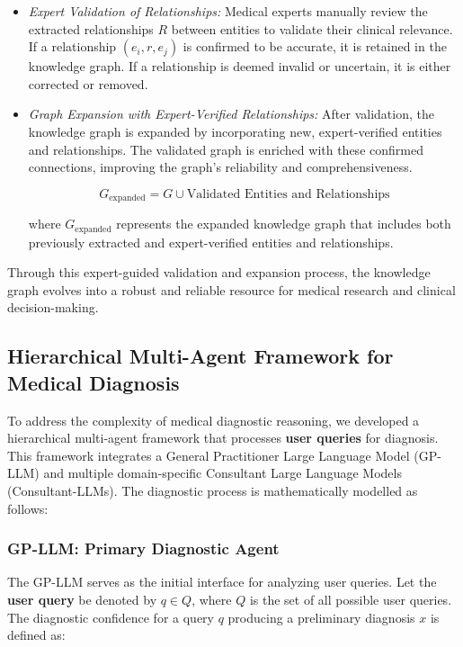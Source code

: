 \documentclass[letterpaper]{article} %
\begin{document}
\begin{itemize}
    \item \emph{Expert Validation of Relationships:} Medical experts manually review the extracted relationships \( R \) between entities to validate their clinical relevance. If a relationship \( (e_i, r, e_j) \) is confirmed to be accurate, it is retained in the knowledge graph. If a relationship is deemed invalid or uncertain, it is either corrected or removed.
    
    \item \emph{Graph Expansion with Expert-Verified Relationships:} After validation, the knowledge graph is expanded by incorporating new, expert-verified entities and relationships. The validated graph is enriched with these confirmed connections, improving the graph’s reliability and comprehensiveness.
    
    \[
    G_{\text{expanded}} = G \cup \text{Validated Entities and Relationships}
    \]
    
    where \( G_{\text{expanded}} \) represents the expanded knowledge graph that includes both previously extracted and expert-verified entities and relationships.
\end{itemize}

Through this expert-guided validation and expansion process, the knowledge graph evolves into a robust and reliable resource for medical research and clinical decision-making.

\subsection{Hierarchical Multi-Agent Framework for Medical Diagnosis}

To address the complexity of medical diagnostic reasoning, we developed a hierarchical multi-agent framework that processes \textbf{user queries} for diagnosis. This framework integrates a General Practitioner Large Language Model (GP-LLM) and multiple domain-specific Consultant Large Language Models (Consultant-LLMs). The diagnostic process is mathematically modelled as follows:

\subsubsection{GP-LLM: Primary Diagnostic Agent}

The GP-LLM serves as the initial interface for analyzing user queries. Let the \textbf{user query} be denoted by \( q \in Q \), where \( Q \) is the set of all possible user queries. The diagnostic confidence for a query \( q \) producing a preliminary diagnosis \( x \) is defined as:
\end{document}
